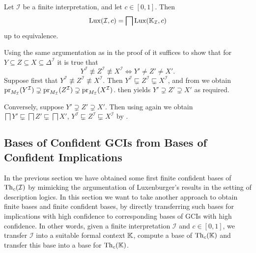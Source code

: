 \begin{Corollary}
  \label{cor:Lux-from-K_I}
  Let $\mathcal{I}$ be a finite interpretation, and let $c \in [0,1]$.  Then
  \begin{equation*}
    \operatorname{Lux}(\mathcal{I}, c) = \bigsqcap \operatorname{Lux}({\mathbb{K}}_{\mathcal{I}}, c)
  \end{equation*}
  up to equivalence.
\end{Corollary}
\begin{Proof}
  Using the same argumentation as in the proof of  it suffices to
  show that for $Y \subseteq Z \subseteq X \subseteq \Delta^{\mathcal{I}}$ it is true that
  \begin{equation}
    \label{eq:32}
    Y^{\mathcal{I}} \not\equiv Z^{\mathcal{I}} \not\equiv X^{\mathcal{I}} \iff Y' \neq Z'
    \neq X'.
  \end{equation}
  Suppose first that $Y^{\mathcal{I}} \not\equiv Z^{\mathcal{I}} \not\equiv
  X^{\mathcal{I}}$.  Then $Y^{\mathcal{I}} \sqsubsetneq Z^{\mathcal{I}} \sqsubsetneq
  X^{\mathcal{I}}$, and from  we
  obtain $\operatorname{pr}_{M_{\mathcal{I}}}(Y^{\mathcal{I}}) \supsetneq \operatorname{pr}_{M_{\mathcal{I}}}(Z^{\mathcal{I}})
  \supsetneq \operatorname{pr}_{M_{\mathcal{I}}}(X^{\mathcal{I}})$.  
  then yields $Y' \supsetneq Z' \supsetneq X'$ as required.

  Conversely, suppose $Y' \supsetneq Z' \supsetneq X'$.  Then using
   again we obtain $\bigsqcap Y'
  \sqsubsetneq \bigsqcap Z' \sqsubsetneq \bigsqcap X'$, \ie $Y^{\mathcal{I}} \sqsubsetneq
  Z^{\mathcal{I}} \sqsubsetneq X^{\mathcal{I}}$ by .
\end{Proof}

\subsection{Bases of Confident GCIs from Bases of Confident Implications}
\label{sec:bases-confident-gcis}

In the previous section we have obtained some first finite confident bases of
$\operatorname{Th}_c(\mathcal{I})$ by mimicking the argumentation of Luxenburger's results in the
setting of description logics.  In this section we want to take another approach to obtain
finite bases and finite confident bases, by directly transferring such bases for
implications with high confidence to corresponding bases of GCIs with high confidence.  In
other words, given a finite interpretation $\mathcal{I}$ and $c \in [0,1]$, we transfer
$\mathcal{I}$ into a suitable formal context ${\mathbb{K}}$, compute a base of $\operatorname{Th}_c({\mathbb{K}})$
and transfer this base into a base for $\operatorname{Th}_c({\mathbb{K}})$.

